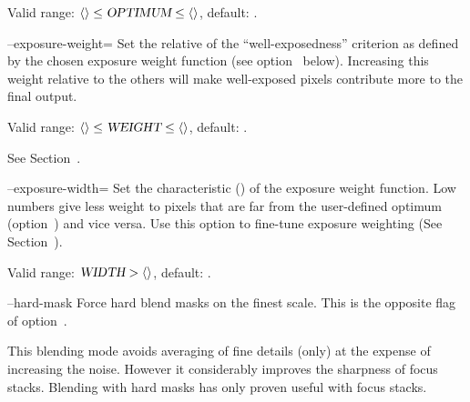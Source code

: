 \begin{codelist}
  Valid range: $\val{val:minimum-exposure-optimum} \leq \metavar{OPTIMUM} \leq
  \val{val:maximum-exposure-optimum}$, default: .


  \label{opt:exposure-weight}%
\item[--exposure-weight=\metavar{WEIGHT}]\itemend
  Set the relative  of the ``well-exposedness'' criterion as defined by the
  chosen exposure weight function (see option~
  below).  Increasing this weight relative to the others will make well-exposed pixels
  contribute more to the final output.

  Valid range: $\val{val:minimum-weight-exposure} \leq
  \metavar{WEIGHT} \leq \val{val:maximum-weight-exposure}$, default:
  .

  See Section~.


  \label{opt:exposure-width}%
\item[--exposure-width=\metavar{WIDTH}]\itemend
  Set the characteristic  () of the exposure weight function.  Low
  numbers give less weight to pixels that are far from the user-defined optimum
  (option~) and vice versa.  Use
  this option to fine-tune exposure weighting (See Section~).

  Valid range: $\metavar{WIDTH} > \val{val:minimum-exposure-width}$, default:
  .


  \label{opt:hard-mask}%
\item[--hard-mask]\itemend
  Force hard blend masks on the finest scale.  This is the opposite flag of
  option~.

  This blending mode avoids averaging of fine details (only) at the expense of increasing the
  noise.  However it considerably improves the sharpness of focus stacks.  Blending with hard
  masks has only proven useful with focus stacks.


\end{codelist}
